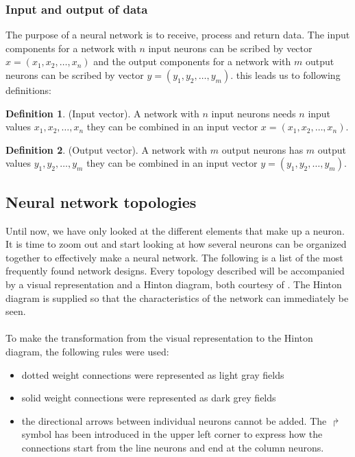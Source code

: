 \documentclass[pdftex,a4paper,12pt,twoside]{report}
\theoremstyle{plain} \newtheorem{theorem}{Theorem} \newtheorem{proposition}{Proposition} \newtheorem{lemma}{Lemma} \newtheorem*{corollary}{Corollary}
\theoremstyle{definition} \newtheorem{definition}{Definition} \newtheorem{conjecture}{Conjecture} \newtheorem*{example}{Example} \newtheorem{algorithm}{Algorithm}
\theoremstyle{remark} \newtheorem*{remark}{Remark} \newtheorem*{note}{Note} \newtheorem{case}{Case}
\begin{document}
\subsubsection{Input and output of data}
The purpose of a neural network is to receive, process and return data. The input components for a network with $n$ input neurons can be scribed by vector $x = (x_1,x_2, \dotsc ,x_n)$ and the output components for a network with $m$ output neurons can be scribed by vector $y = (y_1,y_2, \dotsc ,y_m)$. this leads us to following definitions:
\begin{definition}
(Input vector). A network with $n$ input neurons needs $n$ input values $x_1,x_2, \dotsc ,x_n$ they can be combined in an input vector $x = (x_1,x_2, \dotsc ,x_n)$.
\end{definition}
\begin{definition}
(Output vector).  A network with $m$ output neurons has $m$ output values $y_1,y_2, \dotsc ,y_m$ they can be combined in an input vector $y = (y_1,y_2, \dotsc ,y_m)$.
\end{definition}
\subsection{Neural network topologies}
Until now, we have only looked at the different elements that make up a neuron. It is time to zoom out and start looking at how several neurons can be organized together to effectively make a neural network. The following is a list of the most frequently found network designs. Every topology described will be accompanied by a visual representation and a Hinton diagram, both courtesy of \citep{Kriesel2013}. The Hinton diagram is supplied so that the characteristics of the network can immediately be seen.\\\\To make the transformation from the visual representation to the Hinton diagram, the following rules were used:
\begin{itemize}
\item dotted weight connections were represented as light gray fields
\item solid weight connections were represented as dark grey fields
\item the directional arrows between individual neurons cannot be added. The $\Rsh$ symbol has been introduced in the upper left corner to express how the  connections start from the line neurons and end at the column neurons.
\end{itemize}
\end{document}
